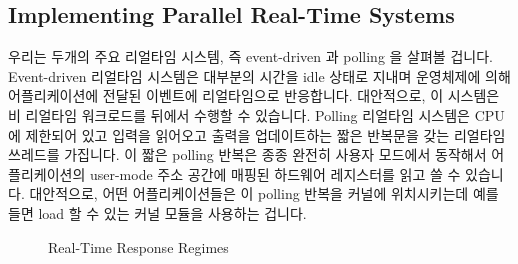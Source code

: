 \fi

\subsection{Implementing Parallel Real-Time Systems}
\label{sec:advsync:Implementing Parallel Real-Time Systems}

우리는 두개의 주요 리얼타임 시스템, 즉 event-driven 과 polling 을 살펴볼
겁니다.
Event-driven 리얼타임 시스템은 대부분의 시간을 idle 상태로 지내며 운영체제에
의해 어플리케이션에 전달된 이벤트에 리얼타임으로 반응합니다.
대안적으로, 이 시스템은 비 리얼타임 워크로드를 뒤에서 수행할 수 있습니다.
Polling 리얼타임 시스템은 CPU 에 제한되어 있고 입력을 읽어오고 출력을
업데이트하는 짧은 반복문을 갖는 리얼타임 쓰레드를 가집니다.
이 짧은 polling 반복은 종종 완전히 사용자 모드에서 동작해서 어플리케이션의
user-mode 주소 공간에 매핑된 하드웨어 레지스터를 읽고 쓸 수 있습니다.
대안적으로, 어떤 어플리케이션들은 이 polling 반복을 커널에 위치시키는데 예를
들면 load 할 수 있는 커널 모듈을 사용하는 겁니다.

\begin{figure}[tb]
\centering
{}
\caption{Real-Time Response Regimes}
\label{fig:advsync:Real-Time Response Regimes}
\end{figure}

